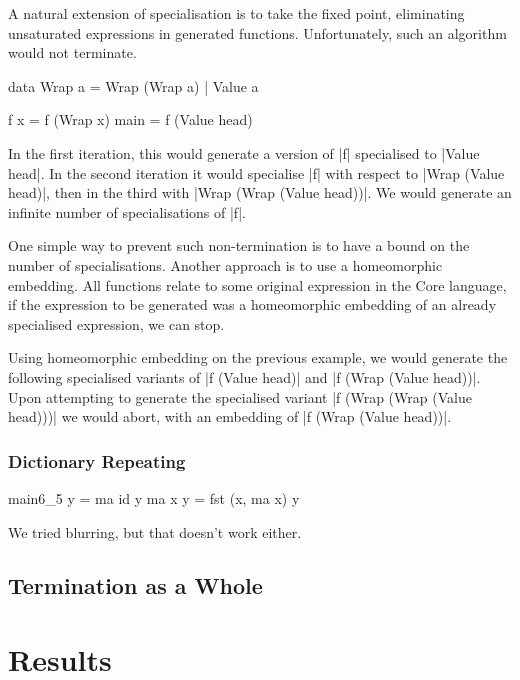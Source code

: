 \documentclass[preprint]{sigplanconf}
\begin{document}
A natural extension of specialisation is to take the fixed point, eliminating unsaturated expressions in generated functions. Unfortunately, such an algorithm would not terminate.

\begin{example}
\begin{code}
data Wrap a  =  Wrap (Wrap a)
             |  Value a

f x = f (Wrap x)
main = f (Value head)
\end{code}

In the first iteration, this would generate a version of |f| specialised to |Value head|. In the second iteration it would specialise |f| with respect to |Wrap (Value head)|, then in the third with |Wrap (Wrap (Value head))|. We would generate an infinite number of specialisations of |f|.
\end{example}

One simple way to prevent such non-termination is to have a bound on the number of specialisations. Another approach is to use a homeomorphic embedding. All functions relate to some original expression in the Core language, if the expression to be generated was a homeomorphic embedding of an already specialised expression, we can stop.

Using homeomorphic embedding on the previous example, we would generate the following specialised variants of |f (Value head)| and |f (Wrap (Value head))|. Upon attempting to generate the specialised variant |f (Wrap (Wrap (Value head)))| we would abort, with an embedding of |f (Wrap (Value head))|.


\subsubsection{Dictionary Repeating}

\begin{code}
main6_5 y = ma id y
ma x y = fst (x, ma x) y
\end{code}

We tried blurring, but that doesn't work either.


\subsection{Termination as a Whole}





\section{Results}
\end{document}
